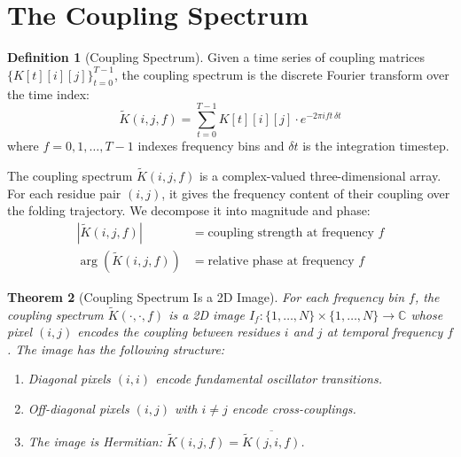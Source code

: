 \documentclass[11pt,twocolumn,a4paper]{article}
\newtheorem{theorem}{Theorem}[section]
\theoremstyle{definition}
\newtheorem{definition}[theorem]{Definition}
\theoremstyle{remark}
\newcommand{\Ktilde}{\tilde{K}}
\begin{document}
\section{The Coupling Spectrum}
\label{sec:coupling_spectrum}

\begin{definition}[Coupling Spectrum]
\label{def:coupling_spectrum}
Given a time series of coupling matrices $\{K[t][i][j]\}_{t=0}^{T-1}$, the coupling spectrum is the discrete Fourier transform over the time index:
\begin{equation}
\label{eq:coupling_spectrum}
\Ktilde(i, j, f) = \sum_{t=0}^{T-1} K[t][i][j] \cdot e^{-2\pi i f t \, \delta t}
\end{equation}
where $f = 0, 1, \ldots, T-1$ indexes frequency bins and $\delta t$ is the integration timestep.
\end{definition}

The coupling spectrum $\Ktilde(i, j, f)$ is a complex-valued three-dimensional array. For each residue pair $(i, j)$, it gives the frequency content of their coupling over the folding trajectory. We decompose it into magnitude and phase:
\begin{align}
|\Ktilde(i, j, f)| &= \text{coupling strength at frequency } f \\
\arg(\Ktilde(i, j, f)) &= \text{relative phase at frequency } f
\end{align}

\begin{theorem}[Coupling Spectrum Is a 2D Image]
\label{thm:spectrum_image}
For each frequency bin $f$, the coupling spectrum $\Ktilde(\cdot, \cdot, f)$ is a 2D image $I_f: \{1,\ldots,N\} \times \{1,\ldots,N\} \to \mathbb{C}$ whose pixel $(i,j)$ encodes the coupling between residues $i$ and $j$ at temporal frequency $f$. The image has the following structure:
\begin{enumerate}
    \item Diagonal pixels $(i, i)$ encode fundamental oscillator transitions.
    \item Off-diagonal pixels $(i, j)$ with $i \neq j$ encode cross-couplings.
    \item The image is Hermitian: $\Ktilde(i, j, f) = \overline{\Ktilde(j, i, f)}$.
\end{enumerate}
\end{theorem}
\end{document}
